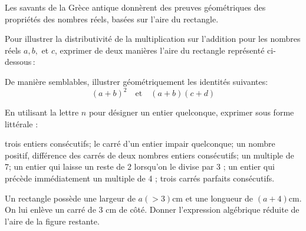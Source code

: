 \documentclass[a4paper,12pt]{report}
\begin{document}
\vspace*{-2\baselineskip}
\begin{acti}
	Les savants de la Grèce antique donnèrent des preuves géométriques des propriétés des nombres réels, basées sur l'aire du rectangle. 
	\begingroup
{%
\belowdisplayskip=-10pt
	\begin{tasks}
	\task 	Pour illustrer la distributivité de la multiplication sur l'addition pour les nombres réels $a,b,$ et $c$, exprimer de deux manières l'aire du rectangle représenté ci-dessous\,:

	\begin{center}
\end{center}
	\task De manière semblables, illustrer géométriquement les identités suivantes\;:
	\[(a+b)^2 \quad \text{et}\quad (a+b)(c+d)\]
	\end{tasks}
}\endgroup
\end{acti}
\begin{acti}
En utilisant la lettre $n$ pour désigner un entier quelconque, exprimer sous forme littérale :
\begin{tasks}
\task trois entiers consécutifs;
\task le carré d'un entier impair quelconque;
\task un nombre positif, différence des carrés de deux nombres entiers consécutifs;
\task un multiple de 7;
\task un entier qui laisse un reste de 2 lorsqu'on le divise par 3 ;
\task un entier qui précède immédiatement un multiple de 4 ;
\task trois carrés parfaits consécutifs.
\end{tasks}
\end{acti}
\begin{acti}
Un rectangle possède une largeur de $a(>3) \mathrm{cm}$ et une longueur de $(a+4) \mathrm{cm}$. On lui enlève un carré de 3 cm de côté. Donner l'expression algébrique réduite de l'aire de la figure restante.
\end{acti}
\end{document}
